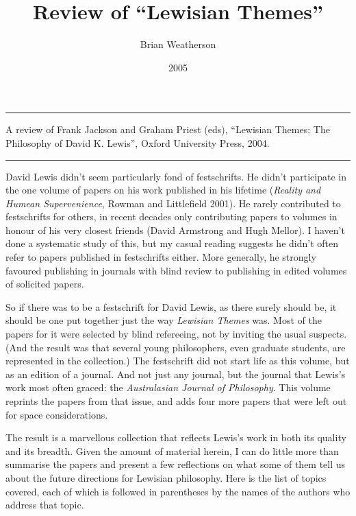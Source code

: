\documentclass[
  10pt,
  letterpaper,
  DIV=11,
  numbers=noendperiod,
  twoside]{scrartcl}
\title{Review of ``Lewisian Themes''}
\author{Brian Weatherson}
\date{2005}
\renewenvironment{abstract}
 {\vspace{-1.25cm}
 \quotation\small\noindent\rule{\linewidth}{.5pt}\par\smallskip
 \noindent }
 {\par\noindent\rule{\linewidth}{.5pt}\endquotation}
\begin{document}
\maketitle
\begin{abstract}
A review of Frank Jackson and Graham Priest (eds), ``Lewisian Themes:
The Philosophy of David K. Lewis'', Oxford University Press, 2004.
\end{abstract}


David Lewis didn't seem particularly fond of festschrifts. He didn't
participate in the one volume of papers on his work published in his
lifetime (\emph{Reality and Humean Supervenience}, Rowman and
Littlefield 2001). He rarely contributed to festschrifts for others, in
recent decades only contributing papers to volumes in honour of his very
closest friends (David Armstrong and Hugh Mellor). I haven't done a
systematic study of this, but my casual reading suggests he didn't often
refer to papers published in festschrifts either. More generally, he
strongly favoured publishing in journals with blind review to publishing
in edited volumes of solicited papers.

So if there was to be a festschrift for David Lewis, as there surely
should be, it should be one put together just the way \emph{Lewisian
Themes} was. Most of the papers for it were selected by blind
refereeing, not by inviting the usual suspects. (And the result was that
several young philosophers, even graduate students, are represented in
the collection.) The festschrift did not start life as this volume, but
as an edition of a journal. And not just any journal, but the journal
that Lewis's work most often graced: the \emph{Australasian Journal of
Philosophy}. This volume reprints the papers from that issue, and adds
four more papers that were left out for space considerations.

The result is a marvellous collection that reflects Lewis's work in both
its quality and its breadth. Given the amount of material herein, I can
do little more than summarise the papers and present a few reflections
on what some of them tell us about the future directions for Lewisian
philosophy. Here is the list of topics covered, each of which is
followed in parentheses by the names of the authors who address that
topic.
\end{document}
